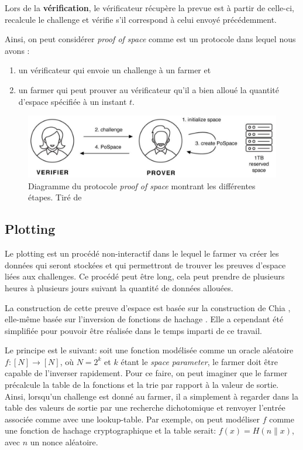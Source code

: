 Lors de la \textbf{vérification}, le vérificateur récupère la prevue est à partir de celle-ci, recalcule le challenge et vérifie s'il correspond à celui envoyé précédemment.

Ainsi, on peut considérer \emph{proof of space} comme est un protocole dans lequel nous avons :

\begin{enumerate}
  \item un vérificateur qui envoie un challenge à un farmer et
  \item un farmer qui peut prouver au vérificateur qu'il a bien alloué la quantité d'espace spécifiée à un instant $t$.
\end{enumerate}

\begin{figure}[H]
  \centering
  \includegraphics[width=\textwidth]{images/pospace.png}
  \caption{Diagramme du protocole \emph{proof of space} montrant les différentes étapes. Tiré de \cite{chia:consensus}}
\end{figure}

\subsection{Plotting}

Le plotting est un procédé non-interactif dans le lequel le farmer va créer les données qui seront stockées et qui permettront de trouver les preuves d'espace liées aux challenges. Ce procédé peut être long, cela peut prendre de plusieurs heures à plusieurs jours suivant la quantité de données allouées.

La construction de cette preuve d'espace est basée sur la construction de Chia \cite{chia:construction}, elle-même basée sur l'inversion de fonctions de hachage \cite{DBLP:conf/asiacrypt/AbusalahACKPR17}. Elle a cependant été simplifiée pour pouvoir être réalisée dans le temps imparti de ce travail. 

Le principe est le suivant: soit une fonction modélisée comme un oracle aléatoire $f: [N] \rightarrow [N]$, où $N=2^k$ et $k$ étant le \emph{space parameter}, le farmer doit être capable de l'inverser rapidement. Pour ce faire, on peut imaginer que le farmer précalcule la table de la fonctions et la trie par rapport à la valeur de sortie. Ainsi, lorsqu'un challenge est donné au farmer, il a simplement à regarder dans la table des valeurs de sortie par une recherche dichotomique et renvoyer l'entrée associée comme avec une lookup-table. Par exemple, on peut modéliser $f$ comme une fonction de hachage cryptographique et la table serait: $f(x) = H(n\|x)$, avec $n$ un nonce aléatoire. \cite{chia:construction}

